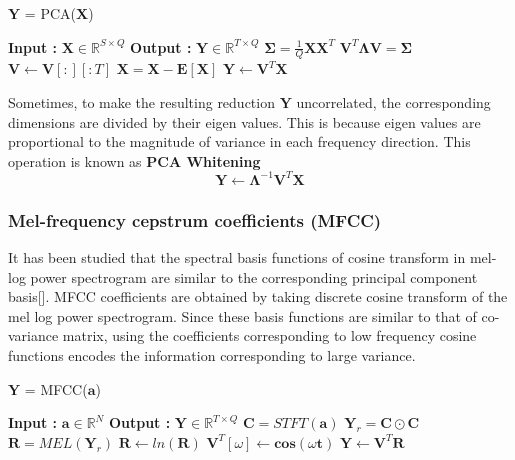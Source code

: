 \begin{algorithm}
  \caption{$\textbf{Y}$ = PCA($\textbf{X}$)}\label{PCA}
  \begin{algorithmic}[1]
    \Statex \textbf{Input :} $\textbf{X} \in \mathbb{R}^{S \times Q}$
    \Statex \textbf{Output :} $\textbf{Y} \in \mathbb{R}^{T \times Q}$
      \State $\bm{\Sigma} = \frac{1}{Q}\textbf{X}\textbf{X}^{T}$ 
      \State $\textbf{V}^{T} \bm{\Lambda} \textbf{V} = \bm{\Sigma}$ 
      \State $\textbf{V} \leftarrow \textbf{V}[:][:T]$ 
      \State $\textbf{\^{X}} = \textbf{X} - \textbf{E}[\textbf{X}]$
      \State $\textbf{Y} \leftarrow \textbf{V}^{T}\textbf{\^{X}}$
  \end{algorithmic}
\end{algorithm}
\FloatBarrier
\bigskip

\noindent Sometimes, to make the resulting reduction $\textbf{Y}$ uncorrelated, the corresponding dimensions are divided by their eigen values. This is because eigen values are proportional to the magnitude of variance in each frequency direction. This operation is known as \textbf{PCA Whitening}   
\[
\textbf{Y} \leftarrow \bm{\Lambda}^{-1}\textbf{V}^{T}\textbf{\^{X}}
\]
\bigskip

\subsubsection{Mel-frequency cepstrum coefficients (MFCC)}
It has been studied that the spectral basis functions of cosine transform in mel-log power spectrogram are similar to the corresponding principal component basis[]. MFCC coefficients are obtained by taking discrete cosine transform of the mel log power spectrogram. Since these basis functions are similar to that of co-variance matrix, using the coefficients corresponding to low frequency cosine functions encodes the information corresponding to large variance. 
\begin{algorithm}
  \caption{$\textbf{Y}$ = MFCC($\textbf{a}$) }\label{MFCC}
  \begin{algorithmic}[1]
    \Statex \textbf{Input :} $\textbf{a} \in \mathbb{R}^{N}$
    \Statex \textbf{Output :} $\textbf{Y} \in \mathbb{R}^{T \times Q}$ 
    \State $\textbf{C} = STFT(\textbf{a})$ 
    \State $\textbf{Y}_{r} = \textbf{C} \odot \textbf{C}$ 
    \State $\textbf{R} = MEL(\textbf{Y}_{r})$ 
    \State $\textbf{R} \leftarrow ln(\textbf{R})$
    \State $\textbf{V}^{T}[ \omega ] \leftarrow \textbf{cos}( \omega \textbf{t})$  
    \EndFor
    \State $\textbf{Y} \leftarrow \textbf{V}^{T}\textbf{R}$
  \end{algorithmic}
\end{algorithm}
 

